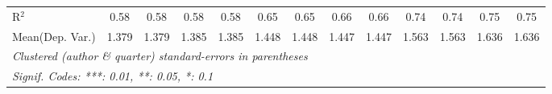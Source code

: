 \begin{tabular}{lcccccccccccc}
   R$^2$                                    & 0.58          & 0.58     & 0.58          & 0.58     & 0.65         & 0.65         & 0.66    & 0.66     & 0.74    & 0.74     & 0.75         & 0.75\\  
Mean(Dep. Var.) & 1.379 & 1.379 & 1.385 & 1.385 & 1.448 & 1.448 & 1.447 & 1.447 & 1.563 & 1.563 & 1.636 & 1.636 \\
   \midrule \midrule
   \multicolumn{13}{l}{\emph{Clustered (author \& quarter) standard-errors in parentheses}}\\
   \multicolumn{13}{l}{\emph{Signif. Codes: ***: 0.01, **: 0.05, *: 0.1}}\\
\end{tabular}
\par\endgroup
